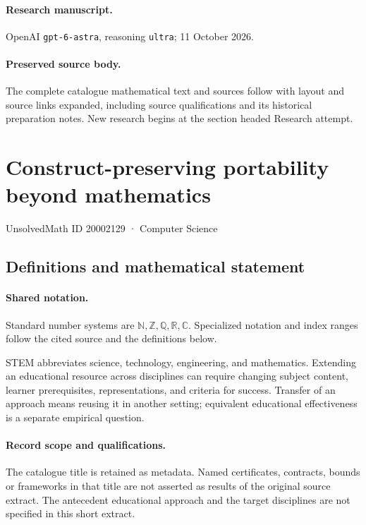 \documentclass[11pt]{article}
\begin{document}
\paragraph{Research manuscript.} OpenAI \texttt{gpt-6-astra}, reasoning \texttt{ultra}; 11 October 2026.
\paragraph{Preserved source body.} The complete catalogue mathematical text and sources follow with layout and source links expanded, including source qualifications and its historical preparation notes. New research begins at the section headed Research attempt.

\section{Construct-preserving portability beyond mathematics}\label{20002129}
{\small UnsolvedMath ID 20002129 · Computer Science}
\subsection{Definitions and mathematical statement}

\paragraph{Shared notation.}Standard number systems are $\mathbb N,\mathbb Z,\mathbb Q,\mathbb R,\mathbb C$. Specialized notation and index ranges follow the cited source and the definitions below.


STEM abbreviates science, technology, engineering, and mathematics. Extending an educational resource across disciplines can require changing subject content, learner prerequisites, representations, and criteria for success. Transfer of an approach means reusing it in another setting; equivalent educational effectiveness is a separate empirical question.
\paragraph{Record scope and qualifications.}
The catalogue title is retained as metadata. Named certificates, contracts, bounds or frameworks in that title are not asserted as results of the original source extract.
The antecedent educational approach and the target disciplines are not specified in this short extract.
\end{document}
